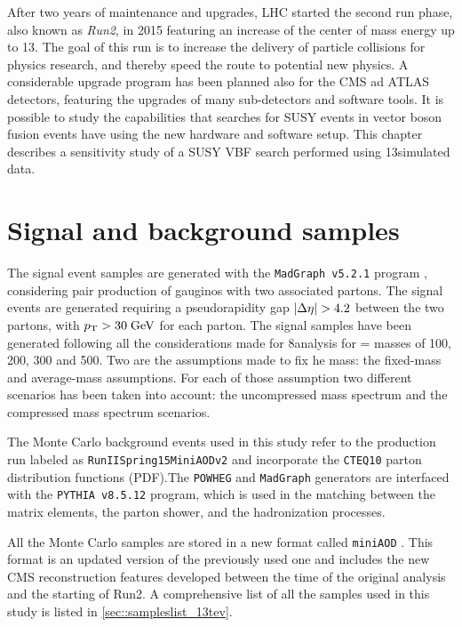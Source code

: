 

After two years of maintenance and upgrades, LHC started the second run phase, also known as \textit{Run2}, in 2015 featuring an increase of the center of mass energy up to 13\tev. The goal of this run is to increase the delivery of particle collisions for physics research, and thereby speed the route to potential new physics. A considerable upgrade program has been planned also for the CMS ad ATLAS detectors, featuring the upgrades of many sub-detectors and software tools. It is possible to study the capabilities that searches for SUSY events in vector boson fusion events have using the new hardware and software setup. This chapter describes a sensitivity study of a SUSY VBF search performed using 13\tev simulated data.

\section{Signal and background samples}

The signal event samples are generated with the \texttt{MadGraph v5.2.1} program \cite{Alwall:2011uj}, considering pair production of gauginos with two associated partons. The signal events are generated requiring a pseudorapidity gap $|\Delta\eta| > 4.2$ between the two partons, with $p_{\text{T}} > 30\;\text{Ge}\kern-0.06667em\text{V}$ for each parton. The signal samples have been generated following all the considerations made for 8\tev analysis for \charginopm = \neutralinotwo masses of 100, 200, 300 and 500\gev. Two are the assumptions made to fix he \stau mass: the fixed-mass and average-mass assumptions. For each of those assumption two different scenarios has been taken into account: the uncompressed mass spectrum and the compressed mass spectrum scenarios.

The Monte Carlo background events used in this study refer to the production run labeled as \texttt{RunIISpring15MiniAODv2} and incorporate the \texttt{CTEQ10} \cite{Dulat:2013hea} parton distribution functions (PDF).The \texttt{POWHEG} and \texttt{MadGraph} generators are interfaced with the \texttt{PYTHIA v8.5.12} \cite{Sjostrand:2006za} program, which is used in the matching between the matrix elements, the parton shower, and the hadronization processes. 

All the Monte Carlo samples are stored in a new format called \texttt{miniAOD} \cite{bib:WorkBookMiniAOD}. This format is an updated version of the previously used one and includes the new CMS reconstruction features developed between the time of the original analysis and the starting of Run2. A comprehensive list of all the samples used in this study is listed in \autoref{sec::sampleslist_13tev}.

